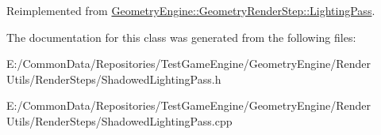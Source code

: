 Reimplemented from \mbox{\hyperlink{class_geometry_engine_1_1_geometry_render_step_1_1_lighting_pass_ae6d9fa99f67e659839ca310947787f52}{Geometry\+Engine\+::\+Geometry\+Render\+Step\+::\+Lighting\+Pass}}.



The documentation for this class was generated from the following files\+:\begin{DoxyCompactItemize}
\item 
E\+:/\+Common\+Data/\+Repositories/\+Test\+Game\+Engine/\+Geometry\+Engine/\+Render Utils/\+Render\+Steps/Shadowed\+Lighting\+Pass.\+h\item 
E\+:/\+Common\+Data/\+Repositories/\+Test\+Game\+Engine/\+Geometry\+Engine/\+Render Utils/\+Render\+Steps/Shadowed\+Lighting\+Pass.\+cpp\end{DoxyCompactItemize}
